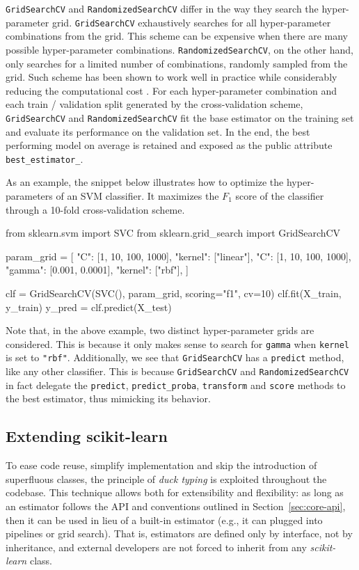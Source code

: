 \documentclass{llncs}
\newcommand{\sklearn}{\textit{scikit-learn}\xspace}
\begin{document}
\texttt{GridSearchCV} and \texttt{RandomizedSearchCV} differ in the way they
search the hyper-parameter grid.  \texttt{GridSearchCV} exhaustively searches
for all hyper-parameter combinations from the grid. This scheme can be expensive
when there are many possible hyper-parameter combinations.
\texttt{RandomizedSearchCV}, on the other hand, only searches for a limited
number of combinations, randomly sampled from the grid. Such scheme has been
shown to work well in practice while considerably reducing the computational
cost \citep{bergstra2012}. For each hyper-parameter combination and each train /
validation split generated by the cross-validation scheme, \texttt{GridSearchCV}
and \texttt{RandomizedSearchCV} fit the base estimator on the training set and
evaluate its performance on the validation set.  In the end, the best performing
model on average is retained and exposed as the public attribute
\texttt{best\_estimator\_}.

As an example, the snippet below illustrates how to optimize the
hyper-parameters of an SVM classifier. It maximizes the $F_1$ score of the
classifier through a 10-fold cross-validation scheme.
\begin{pythoncode}
from sklearn.svm import SVC
from sklearn.grid_search import GridSearchCV

param_grid = [
  {"C": [1, 10, 100, 1000], "kernel": ["linear"]},
  {"C": [1, 10, 100, 1000], "gamma": [0.001, 0.0001],
   "kernel": ["rbf"]},
]

clf = GridSearchCV(SVC(), param_grid, scoring="f1", cv=10)
clf.fit(X_train, y_train)
y_pred = clf.predict(X_test)
\end{pythoncode}
Note that, in the above example, two distinct hyper-parameter grids are
considered. This is because it only makes sense to search for \texttt{gamma}
when \texttt{kernel} is set to \texttt{"rbf"}.  Additionally, we see that
\texttt{GridSearchCV} has a \texttt{predict} method, like any other classifier.
This is because \texttt{GridSearchCV} and \texttt{RandomizedSearchCV} in fact
delegate the \texttt{predict}, \texttt{predict\_proba}, \texttt{transform} and
\texttt{score} methods to the best estimator, thus mimicking its behavior.

\subsection{Extending scikit-learn}

To ease code reuse, simplify implementation and skip the introduction of
superfluous classes, the principle of \textit{duck typing} is exploited
throughout the codebase. This technique allows both for extensibility and
flexibility: as long as an estimator follows the API and conventions
outlined in Section~\ref{sec:core-api}, then it can be used in lieu of a
built-in estimator (e.g., it can plugged into pipelines or grid search).
That is, estimators are defined only by interface, not by inheritance,
and external developers are not forced to inherit from any \sklearn class.
\end{document}

